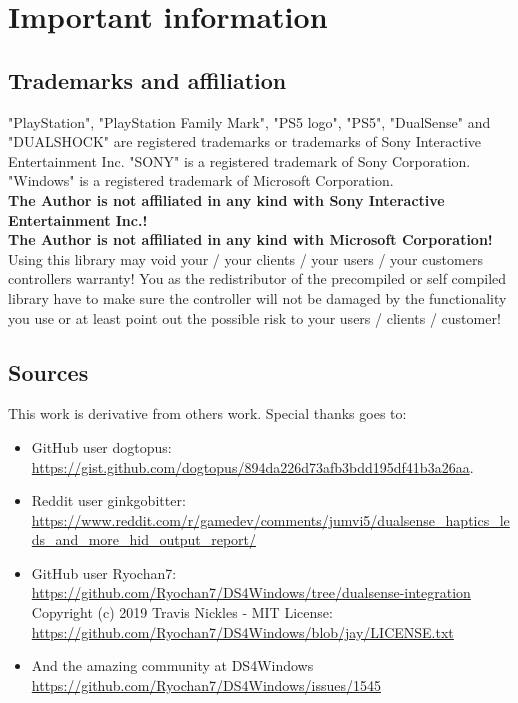 \section{Important information}
\subsection{Trademarks and affiliation}
"PlayStation", "PlayStation Family Mark", "PS5 logo", "PS5", "DualSense" and "DUALSHOCK" are registered trademarks or trademarks of Sony Interactive Entertainment Inc. "SONY" is a registered trademark of Sony Corporation. \\

"Windows" is a registered trademark of Microsoft Corporation. \\

\textbf{The Author is not affiliated in any kind with Sony Interactive Entertainment Inc.!} \\
\textbf{The Author is not affiliated in any kind with Microsoft Corporation!} \\
Using this library may void your / your clients / your users / your customers controllers warranty! You as the redistributor of the precompiled or self compiled library have to make sure the controller will not be damaged by the functionality you use or at least point out the possible risk to your users / clients / customer!\\

\subsection{Sources}
This work is derivative from others work. Special thanks goes to:
\begin{itemize}
	\item GitHub user dogtopus: \\ \url{https://gist.github.com/dogtopus/894da226d73afb3bdd195df41b3a26aa}.
	\item Reddit user ginkgobitter: \url{https://www.reddit.com/r/gamedev/comments/jumvi5/dualsense_haptics_leds_and_more_hid_output_report/}
	\item GitHub user Ryochan7: \url{https://github.com/Ryochan7/DS4Windows/tree/dualsense-integration} \\ Copyright (c) 2019 Travis Nickles - MIT License: \url{https://github.com/Ryochan7/DS4Windows/blob/jay/LICENSE.txt} 
	\item And the amazing community at DS4Windows \url{https://github.com/Ryochan7/DS4Windows/issues/1545}
	
\end{itemize}
\newpage

